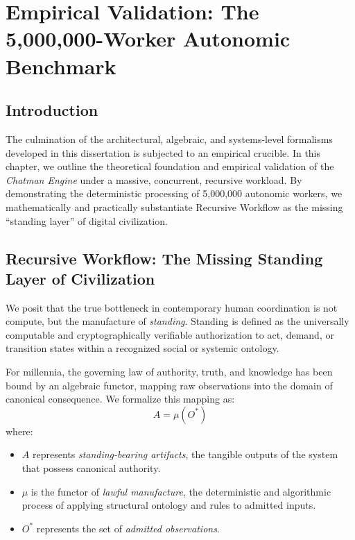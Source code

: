 \chapter{Empirical Validation: The 5,000,000-Worker Autonomic Benchmark}
\label{ch:autonomic_benchmark}

\section{Introduction}
The culmination of the architectural, algebraic, and systems-level formalisms developed in this dissertation is subjected to an empirical crucible. In this chapter, we outline the theoretical foundation and empirical validation of the \textit{Chatman Engine} under a massive, concurrent, recursive workload. By demonstrating the deterministic processing of 5,000,000 autonomic workers, we mathematically and practically substantiate Recursive Workflow as the missing ``standing layer'' of digital civilization.

\section{Recursive Workflow: The Missing Standing Layer of Civilization}

We posit that the true bottleneck in contemporary human coordination is not compute, but the manufacture of \textit{standing}. Standing is defined as the universally computable and cryptographically verifiable authorization to act, demand, or transition states within a recognized social or systemic ontology.

For millennia, the governing law of authority, truth, and knowledge has been bound by an algebraic functor, mapping raw observations into the domain of canonical consequence. We formalize this mapping as:
\begin{equation}
A = \mu(O^*)
\end{equation}
where:
\begin{itemize}
    \item $A$ represents \textit{standing-bearing artifacts}, the tangible outputs of the system that possess canonical authority.
    \item $\mu$ is the functor of \textit{lawful manufacture}, the deterministic and algorithmic process of applying structural ontology and rules to admitted inputs.
    \item $O^*$ represents the set of \textit{admitted observations}. 
\end{itemize}

